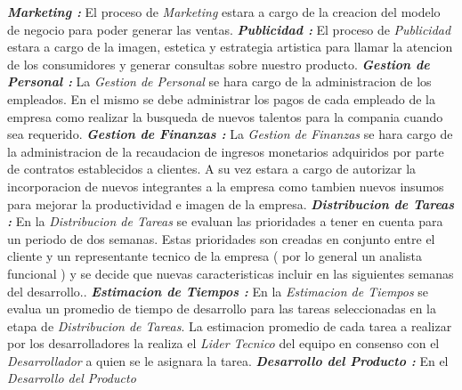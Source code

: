 \documentclass[
10pt, %
a4paper, %
oneside, %
headinclude,footinclude, %
BCOR5mm, %
]{scrartcl}
\begin{document}
  \begin{flushleft}
  \textbf{ \emph{Marketing : } } El proceso de \textit{Marketing} estara
  a cargo de la creacion del modelo de negocio para poder generar las ventas.
   \newline \newline
  \textbf{ \emph{Publicidad : } } El proceso de \textit{Publicidad} estara
  a cargo de la imagen, estetica y estrategia artistica para llamar la atencion
  de los consumidores y generar consultas sobre nuestro producto.
   \newline \newline
  \textbf{ \emph{Gestion de Personal : } } La \textit{Gestion de Personal}
  se hara cargo de la administracion de los empleados. En el mismo se debe
  administrar los pagos de cada empleado de la empresa como realizar la busqueda
  de nuevos talentos para la compania cuando sea requerido.
   \newline \newline
  \textbf{ \emph{Gestion de Finanzas : } } La \textit{Gestion  de Finanzas} se
   hara cargo de la administracion de la recaudacion de ingresos monetarios
   adquiridos por parte de contratos establecidos a clientes. A su vez
   estara a cargo de autorizar la incorporacion de nuevos integrantes a la
   empresa como tambien nuevos insumos para mejorar la productividad e
   imagen de la empresa.
   \newline \newline
  \textbf{ \emph{Distribucion de Tareas : } } En la \textit{Distribucion de Tareas}
  se evaluan las prioridades a tener en cuenta para un periodo de dos semanas.
  Estas prioridades son creadas en conjunto entre el cliente y un representante
  tecnico de la empresa ( por lo general un analista funcional ) y se decide
  que nuevas caracteristicas incluir en las siguientes semanas del desarrollo..
  \newline  \newline
  \textbf{ \emph{Estimacion de Tiempos : } } En la \textit{Estimacion de Tiempos}
  se evalua un promedio de tiempo de desarrollo  para las tareas seleccionadas
  en la etapa de \textit{Distribucion de Tareas}. La estimacion promedio de
  cada  tarea a realizar por los desarrolladores la realiza el
  \textit{Lider Tecnico} del equipo en consenso con el \textit{Desarrollador}
  a quien se le asignara la tarea.
  \newline  \newline
  \textbf{ \emph{Desarrollo del Producto : } } En el \textit{Desarrollo del Producto}

\end{flushleft}
\end{document}
